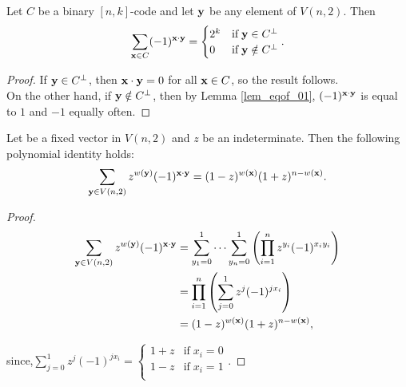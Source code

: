 \documentclass[../main.tex]{subfiles}
\begin{document}
\begin{lem}\label{lem_2k0}
	Let $C$ be a binary $[n,k]$-code and let $\textbf{y}$ be any element of $V(n,2)$. Then
	\[
		\sum_{\textbf{x} \in C} (-1)^{\textbf{x}\cdot \textbf{y}} = 
		\begin{cases}
			2^k & \text{if}\; \textbf{y} \in C^{\perp} \\
			0 & \text{if}\; \textbf{y} \notin C^{\perp} \\
		\end{cases}.
	\]
\end{lem}
\begin{proof}
	If $\textbf{y} \in C^{\perp}$, then $\textbf{x}\cdot \textbf{y} = 0$ for all $\textbf{x} \in C$, so the result follows.\\
	On the other hand, if $\textbf{y} \notin C^\perp$, then by Lemma \ref{lem_eqof_01}, $(-1)^{\textbf{x}\cdot \textbf{y}}$ is equal to $1$ and $-1$ equally often.
\end{proof}

\begin{lem}\label{lem_poly?}
	Let  be a fixed vector in $V(n,2)$ and $z$ be an indeterminate. Then the following polynomial identity holds:
	\[
		\sum_{\textbf{y} \in V(n,2)} z^{w(\textbf{y})}(-1)^{\textbf{x}\cdot \textbf{y}} = 
		(1-z)^{w(\textbf{x})}(1+z)^{n-w(\textbf{x})}.
	\]
\end{lem}

\begin{proof}
	\begin{align*}
		\sum_{\textbf{y} \in V(n,2)} z^{w(\textbf{y})}(-1)^{\textbf{x}\cdot \textbf{y}} &= 
		\sum_{y_1=0}^1 \cdots \sum_{y_n=0}^{1} \left( \prod_{i=1}^{n} z^{y_i}(-1)^{x_iy_i} \right) \\
		&= \prod_{i=1}^{n} \left( \sum_{j=0}^{1} z^j(-1)^{jx_i} \right)\\
		&= (1-z)^{w(\textbf{x})}(1+z)^{n-w(\textbf{x})}, \\  
	\end{align*}
	
	since,\hspace{10mm}$
		\displaystyle\sum_{j=0}^1 z^{j}(-1)^{jx_i} = 
		\begin{cases}
			1+z & \text{if}\; x_i = 0 \\
			1-z & \text{if}\; x_i = 1 \\
		\end{cases}.
	$ 	
\end{proof}
\end{document}
